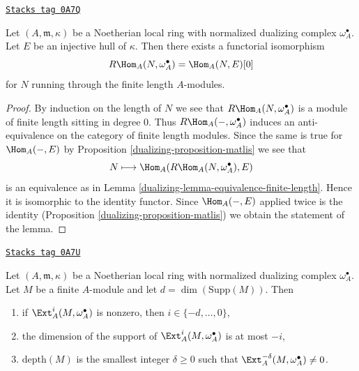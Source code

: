 \begin{lemma}
\label{dualizing-lemma-dualizing-finite-length}
\href{https://stacks.math.columbia.edu/tag/0A7Q}{\texttt{Stacks tag 0A7Q}}

Let $(A, \mathfrak m, \kappa)$ be a Noetherian local
ring with normalized dualizing complex $\omega_A^\bullet$.
Let $E$ be an injective hull of $\kappa$. Then there exists
a functorial isomorphism
$$
R\Hom_A(N, \omega_A^\bullet) = \Hom_A(N, E)[0]
$$
for $N$ running through the finite length $A$-modules.
\end{lemma}

\begin{proof}

By induction on the length of $N$ we see that $R\Hom_A(N, \omega_A^\bullet)$
is a module of finite length sitting in degree $0$. Thus
$R\Hom_A(-, \omega_A^\bullet)$ induces an anti-equivalence
on the category of finite length modules. Since the same is true
for $\Hom_A(-, E)$ by Proposition \ref{dualizing-proposition-matlis} we see that
$$
N \longmapsto \Hom_A(R\Hom_A(N, \omega_A^\bullet), E)
$$
is an equivalence as in Lemma \ref{dualizing-lemma-equivalence-finite-length}.
Hence it is isomorphic to the identity functor.
Since $\Hom_A(-, E)$ applied twice is the identity
(Proposition \ref{dualizing-proposition-matlis}) we obtain
the statement of the lemma.
\end{proof}

\begin{lemma}
\label{dualizing-lemma-sitting-in-degrees}
\href{https://stacks.math.columbia.edu/tag/0A7U}{\texttt{Stacks tag 0A7U}}

Let $(A, \mathfrak m, \kappa)$ be a Noetherian local ring with
normalized dualizing complex $\omega_A^\bullet$. Let $M$ be a finite
$A$-module and let $d = \dim(\text{Supp}(M))$. Then
\begin{enumerate}
\item if $\Ext^i_A(M, \omega_A^\bullet)$ is nonzero, then
$i \in \{-d, \ldots, 0\}$,
\item the dimension of the support of $\Ext^i_A(M, \omega_A^\bullet)$
is at most $-i$,
\item $\text{depth}(M)$ is the smallest integer $\delta \geq 0$ such that
$\Ext^{-\delta}_A(M, \omega_A^\bullet) \not = 0$.
\end{enumerate}
\end{lemma}

